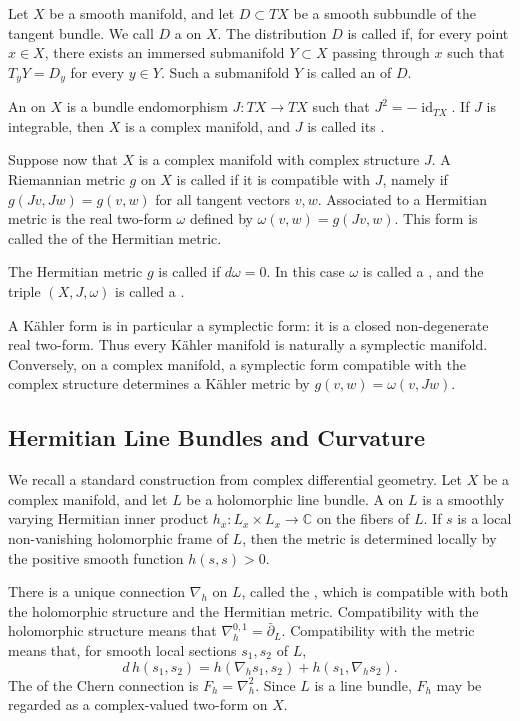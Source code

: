 {Let \(X\) be a smooth manifold, and let \(D\subset TX\) be a smooth
subbundle of the tangent bundle.  We call \(D\) a 
on \(X\).  The distribution \(D\) is called  if, for
every point \(x\in X\), there exists an immersed submanifold
\(Y\subset X\) passing through \(x\) such that \(T_yY=D_y\) for every
\(y\in Y\).  Such a submanifold \(Y\) is called an  of \(D\).

An  on \(X\) is a bundle endomorphism
\(J:TX\to TX\) such that \(J^2=-\operatorname{id}_{TX}\).  If \(J\) is
integrable, then \(X\) is a complex manifold, and \(J\) is called its
.

Suppose now that \(X\) is a complex manifold with complex structure
\(J\).  A Riemannian metric \(g\) on \(X\) is called
 if it is compatible with \(J\), namely if
\(g(Jv,Jw)=g(v,w)\) for all tangent vectors \(v,w\).  Associated to a
Hermitian metric is the real two-form \(\omega\) defined by
\(\omega(v,w)=g(Jv,w)\).  This form is called the  of the Hermitian metric.

The Hermitian metric \(g\) is called  if \(d\omega=0\).
In this case \(\omega\) is called a , and the triple
\((X,J,\omega)\) is called a .

A Kähler form is in particular a symplectic form: it is a closed
non-degenerate real two-form.  Thus every Kähler manifold is naturally a
symplectic manifold.  Conversely, on a complex manifold, a symplectic
form compatible with the complex structure determines a Kähler metric by
\(g(v,w)=\omega(v,Jw)\).

\subsection{Hermitian Line Bundles and Curvature}

We recall a standard construction from complex differential geometry.
Let \(X\) be a complex manifold, and let \(L\) be a holomorphic line
bundle.  A  on \(L\) is a smoothly varying
Hermitian inner product \(h_x:L_x\times L_x\to\mathbb C\) on the fibers
of \(L\).  If \(s\) is a local non-vanishing holomorphic frame of \(L\),
then the metric is determined locally by the positive smooth function
\(h(s,s)>0\).

There is a unique connection \(\nabla_h\) on \(L\), called the
, which is compatible with both the holomorphic
structure and the Hermitian metric.  Compatibility with the holomorphic
structure means that \(\nabla_h^{0,1}=\bar\partial_L\).  Compatibility
with the metric means that, for smooth local sections \(s_1,s_2\) of
\(L\),
\[
d\,h(s_1,s_2)
=
h(\nabla_hs_1,s_2)+h(s_1,\nabla_hs_2).
\]
The  of the Chern connection is \(F_h=\nabla_h^2\).
Since \(L\) is a line bundle, \(F_h\) may be regarded as a complex-valued
two-form on \(X\).

}
